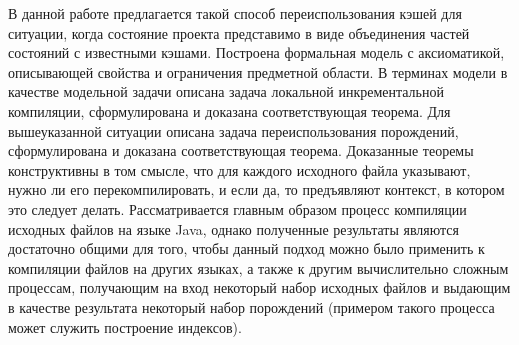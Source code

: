 В данной работе предлагается такой способ переиспользования кэшей для ситуации, когда состояние проекта представимо в виде объединения частей состояний с известными кэшами. Построена формальная модель с аксиоматикой, описывающей свойства и ограничения предметной области. В терминах модели в качестве модельной задачи описана задача локальной инкрементальной компиляции, сформулирована и доказана соответствующая теорема. Для вышеуказанной ситуации описана задача переиспользования порождений, сформулирована и доказана соответствующая теорема. Доказанные теоремы конструктивны в том смысле, что для каждого исходного файла указывают, нужно ли его перекомпилировать, и если да, то предъявляют контекст, в котором это следует делать. Рассматривается главным образом процесс компиляции исходных файлов на языке Java, однако полученные результаты являются достаточно общими для того, чтобы данный подход можно было применить к компиляции файлов на других языках, а также к другим вычислительно сложным процессам, получающим на вход некоторый набор исходных файлов и выдающим в качестве результата некоторый набор порождений (примером такого процесса может служить построение индексов).
